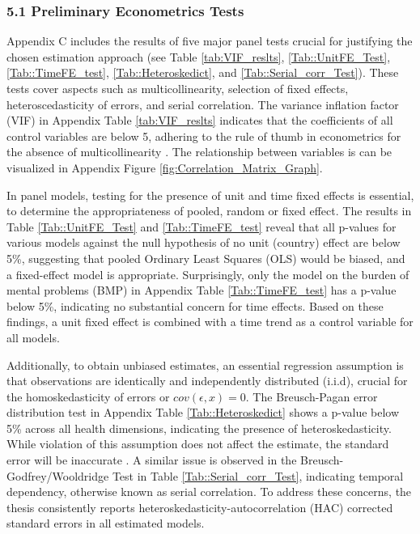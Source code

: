 \subsubsection*{5.1 Preliminary Econometrics Tests}

Appendix C includes the results of five major panel tests crucial for justifying the chosen estimation approach (see Table \ref{tab:VIF_reslts}, \ref{Tab::UnitFE_Test}, \ref{Tab::TimeFE_test}, \ref{Tab::Heteroskedict}, and \ref{Tab::Serial_corr_Test}). These tests cover aspects such as multicollinearity, selection of fixed effects, heteroscedasticity of errors, and serial correlation. The variance inflation factor (VIF) in Appendix Table \ref{tab:VIF_reslts} indicates that the coefficients of all control variables are below 5, adhering to the rule of thumb in econometrics for the absence of multicollinearity \parencite{baltagi2008econometric}. The relationship between variables is can be visualized in Appendix Figure \ref{fig:Correlation_Matrix_Graph}.

In panel models, testing for the presence of unit and time fixed effects is essential, to determine the appropriateness of pooled, random or fixed effect. The results in Table \ref{Tab::UnitFE_Test} and \ref{Tab::TimeFE_test} reveal that all p-values for various models against the null hypothesis of no unit (country) effect are below 5\%, suggesting that pooled Ordinary Least Squares (OLS) would be biased, and a fixed-effect model is appropriate. Surprisingly, only the model on the burden of mental problems (BMP) in Appendix Table \ref{Tab::TimeFE_test} has a p-value below 5\%, indicating no substantial concern for time effects. Based on these findings, a unit fixed effect is combined with a time trend as a control variable for all models.

Additionally, to obtain unbiased estimates, an essential regression assumption is that observations are identically and independently distributed (i.i.d), crucial for the homoskedasticity of errors or $cov(\epsilon, x) = 0$. The Breusch-Pagan error distribution test in Appendix Table \ref{Tab::Heteroskedict} shows a p-value below 5\% across all health dimensions, indicating the presence of heteroskedasticity. While violation of this assumption does not affect the estimate, the standard error will be inaccurate \parencite[see][]{doucouliagos_health_2021, williamson_foreign_2008, nwude_official_2020}. A similar issue is observed in the Breusch-Godfrey/Wooldridge Test in Table \ref{Tab::Serial_corr_Test}, indicating temporal dependency, otherwise known as serial correlation. To address these concerns, the thesis consistently reports heteroskedasticity-autocorrelation (HAC) corrected standard errors in all estimated models.




